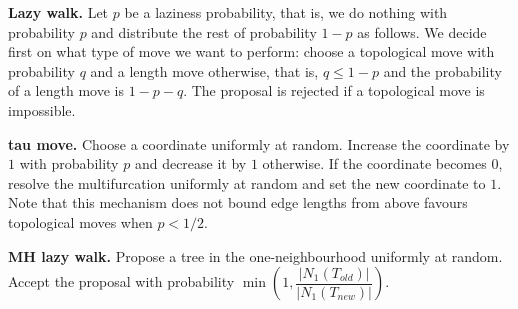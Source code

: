\documentclass{amsart}
\begin{document}
{\bf Lazy walk.} Let $p$ be a laziness probability, that is, we do nothing 
with probability $p$ and distribute the rest of probability $1-p$ as follows. 
We decide first on what type of move we want to perform: choose a topological 
move with probability $q$ and a length move otherwise, that is, $q \leq 1-p$
and the probability of a length move is $1-p-q$. The proposal is rejected if
a topological move is impossible. 

{\bf tau move.} Choose a coordinate uniformly at random. Increase the
coordinate by $1$ with probability $p$ and decrease it by $1$ otherwise.
If the coordinate becomes $0$, resolve the multifurcation uniformly at
random and set the new coordinate to $1$. Note that this mechanism 
does not bound edge lengths from above favours topological moves when 
$p<1/2$. 

{\bf MH lazy walk.} Propose a tree in the one-neighbourhood uniformly at random. 
Accept the proposal with probability 
$\min(1, \dfrac{|N_1(T_{old})|}{|N_1(T_{new})|})$. 
\end{document}
